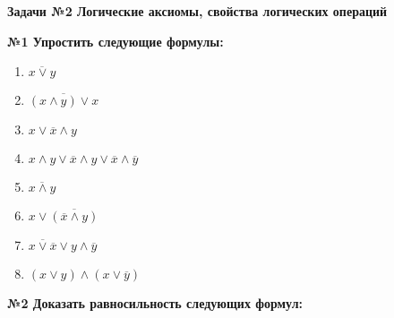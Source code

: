 \usepackage{stmaryrd}%



    \begin{center}
        \textbf{Задачи №2 Логические аксиомы, свойства логических операций}\\
    \end{center}

    \begin{center}
        \textbf{№1 Упростить следующие формулы:}
    \end{center}

    \begin{minipage}[t]{0.3\textwidth}
        \centering
        \begin{enumerate}
            \item $\overline{x \vee y}$
            \item $\overline{(x \wedge y) \vee x}$
            \item $x \vee \overline x \wedge y$
            \item $x \wedge y \vee \overline x \wedge y \vee \overline x \wedge \overline y$
        \end{enumerate}
    \end{minipage}
    \begin{minipage}[t]{0.3\textwidth}
        \centering
        \begin{enumerate}
            \setcounter{enumi}{4}
            \item $\overline{x \wedge y}$
            \item $x \vee \overline{(\overline x \wedge y)}$
            \item $\overline{x \vee \overline x} \vee y \wedge \overline y$
            \item $(x \vee y) \wedge (x \vee \overline y)$

        \end{enumerate}
    \end{minipage}


    \begin{center}
        \textbf{№2 Доказать равносильность следующих формул:}
    \end{center}

